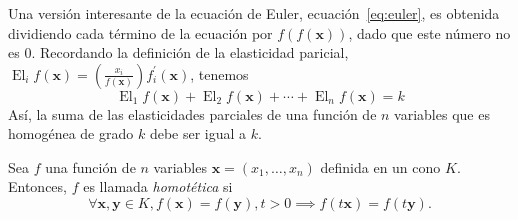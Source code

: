 \begin{frame}[t]
\frametitle{\subsecname}
Una versión interesante de la ecuación de Euler, ecuación~\eqref{eq:euler}, es obtenida dividiendo cada término de la ecuación por $f\left(f\left(\bm{x}\right)\right)$, dado que este número no es $0$. Recordando la definición de la elasticidad paricial, $\operatorname{El}_{i}f\left(\bm{x}\right)=\left(\frac{x_{i}}{f\left(\bm{x}\right)}\right)f^{\prime}_{i}\left(\bm{x}\right)$, tenemos
\begin{equation}
\operatorname{El}_{1}f\left(\bm{x}\right)+\operatorname{El}_{2}f\left(\bm{x}\right)+\cdots+\operatorname{El}_{n}f\left(\bm{x}\right)=k
\end{equation}
Así, la suma de las elasticidades parciales de una función de $n$ variables que es homogénea de grado $k$ debe ser igual a $k$.

\begin{definition}
Sea $f$ una función de $n$ variables $\bm{x}=\left(x_{1},\ldots,x_{n}\right)$ definida en un cono $K$. Entonces, $f$ es llamada \emph{homotética} si \[ \forall\bm{x},\bm{y}\in K,f\left(\bm{x}\right)=f\left(\bm{y}\right),t>0\implies f\left(t\bm{x}\right)=f\left(t\bm{y}\right). \]
\end{definition}
\end{frame}